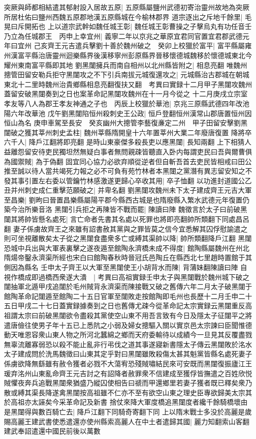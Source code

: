 突厥與師都相結遣其郁射設入居故五原|{
	五原縣屬鹽州武德初寄治靈州故地為突厥所居杜佑曰鹽州西魏五原郡地漢五原縣城在今榆林郡界}
道宗逐出之斥地千餘里|{
	毛晃曰斥開拓也}
上以道宗武幹如魏任城王彰|{
	魏任城王彰曹操之子擊烏丸有功任音壬}
乃立為任城郡王　丙申上幸宜州|{
	義寧二年以京兆之華原宜君同官置宜君郡武德元年曰宜州}
己亥齊王元吉遣兵擊劉十善於魏州破之　癸卯上校獵於富平|{
	富平縣屬雍州漢富平縣治唐靈州迴樂縣界後漢移寧州彭原縣界晉移懷德城魏移於懷德城東北今耀州東南富平縣即其地}
劉黑闥擁兵而南自相州以北州縣皆附之|{
	相息亮翻}
唯魏州摠管田留安勒兵拒守黑闥攻之不下引兵南拔元城復還攻之|{
	元城縣治古郡城在朝城東北十二里時魏州治貴鄉縣相息亮翻復扶又翻　考異曰實録十二月甲子黑闥攻魏州蓋留安破黑闥奏到之日也案革命記黑闥攻魏州在十一月今從之}
十二月庚戌立宗室孝友等八人為郡王孝友神通之子也　丙辰上校獵於華池|{
	京兆三原縣武德四年改池陽六年改華池}
戊午劉黑闥陷恒州殺刺史王公政|{
	恒戶登翻恒州漢常山郡唐置恒州因恒山為名}
庚申車駕至長安　癸亥幽州大摠管李藝復亷定二州　甲子田留安擊劉黑闥破之獲其莘州刺史孟柱|{
	魏州莘縣隋開皇十六年置莘州大業二年廢唐復置}
降將卒六千人|{
	降戶江翻將即亮翻}
是時山東豪傑多殺長吏以應黑闥|{
	長知兩翻}
上下相猜人益離怨留安待吏民獨坦然無疑白事者無問親疎皆聽直入卧内每謂吏民曰吾與爾曹俱為國禦賊|{
	為于偽翻}
固宜同心協力必欲弃順從逆者但自斬吾首去吏民皆相戒曰田公推至誠以待人當共竭死力報之必不可負有苑竹林者本黑闥之黨潛有異志留安知之不發其事引置左右委以管鑰竹林感激遂更歸心卒收其用|{
	卒子恤翻}
以功進封道國公乙丑并州刺史成仁重擊范願破之|{
	并卑名翻}
劉黑闥攻魏州未下太子建成齊王元吉大軍至昌樂|{
	劉昫曰晉置昌樂縣屬陽平郡今縣西古城是也隋廢縣入繁水武德元年復置仍築今治所樂音洛}
黑闥引兵拒之再陳皆不戰而罷|{
	陳讀曰陣}
魏徵言於太子曰前破黑闥其將帥皆懸名處死|{
	言亡命者先書其名處以死罪也將即亮翻帥所類翻下同處昌呂翻}
妻子係虜故齊王之來雖有詔書赦其黨與之罪皆莫之信今宜悉解其囚俘慰諭遣之則可坐視離散矣太子從之黑闥食盡衆多亡或縛其渠帥以降|{
	帥所類翻降戶江翻}
黑闥恐城中兵出與大軍表裏擊之遂夜遁至館陶永濟橋未成不得度|{
	館陶縣屬魏州在州北隋煬帝鑿永濟渠所經也宋白曰館陶春秋時晉冠氏邑陶丘在縣西北七里趙時置館于其側因為縣名}
壬申太子齊王以大軍至黑闥使王小胡背水而陳|{
	背蒲妹翻陳讀曰陣}
自視作橋成即過橋西衆遂大潰　|{
	考異曰高祖實録壬申太子與黑闥戰於魏州城下破之闥抽軍北遁甲戌追闥於毛州賊背永濟渠而陳接戰又破之舊傳六年二月太子破黑闥于館陶革命記闥遁至館陶二十五日官軍至闥敗走按館陶即毛州也長歷十二月壬申二十五日甲戌二十七日蓋實録據奏到之日也舊傳尤疎今從革命記太宗實録云黑闥重反高祖謂太宗曰前破黑闥欲令盡殺其黨使空山東不用吾言致有今日及隱太子征闥平之將遣唐儉往使男子年十五已上悉阬之小弱及婦女摠驅入關以實京邑太宗諫曰臣聞惟德動天唯恩容衆山東人物之所河北蠶綿之鄉而天府委輸待以成績今一旦見其反覆盡戮無辜流離寡弱恐以殺不能止亂非行弔伐之道其事遂寢新書隱太子傳云黑闥敗於洺水太子建成問於洗馬魏徵曰山東其定乎對曰黑闥雖敗殺傷太甚其魁黨皆縣名處死妻子係虜欲降無繇雖有赦令獲者必戮不大蕩宥恐殘賊嘯結民來可安既而黑闥復振廬江王瑗弃洺州山東亂命齊王元吉討之有詔降者赦罪衆不信建成至獲俘皆撫遣之百姓欣悦賊懼夜奔兵追戰黑闥衆猶盛乃縱囚使相告曰禠而甲還鄉里若妻子獲者既已釋矣衆乃散或縛其渠長降遂禽黑闥按高祖雖不仁亦不至有欲空山東之理史臣專欲歸美太宗其於高祖亦太誣矣今采革命記及新書}
捨仗來降大軍度橋追黑闥度者纔千餘騎橋壞由是黑闥得與數百騎亡去|{
	降戶江翻下同騎奇寄翻下同}
上以隋末戰士多没於高麗是歲賜高麗王建武書使悉遣還亦使州縣索高麗人在中土者遣歸其國|{
	麗力知翻索山客翻}
建武奉詔遣還中國民前後以萬數

